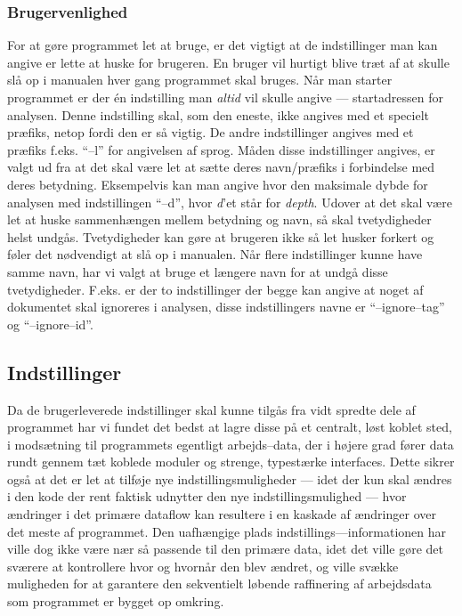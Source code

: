 \documentclass[a4paper,oneside,article]{memoir}
\begin{document}
\subsubsection{Brugervenlighed}
For at gøre programmet let at bruge, er det vigtigt at de
indstillinger man kan angive er lette at huske for brugeren. En bruger
vil hurtigt blive træt af at skulle slå op i manualen hver gang
programmet skal bruges. Når man starter programmet er der én
indstilling man \textit{altid} vil skulle angive --- startadressen for
analysen. Denne indstilling skal, som den eneste, ikke angives med et
specielt præfiks, netop fordi den er så vigtig. De andre indstillinger
angives med et præfiks f.eks. ``--l'' for angivelsen af sprog. Måden
disse indstillinger angives, er valgt ud fra at det skal være let at
sætte deres navn/præfiks i forbindelse med deres
betydning. Eksempelvis kan man angive hvor den maksimale dybde for
analysen med indstillingen ``--d'', hvor \textit{d}'et står for
\textit{depth}. Udover at det skal være let at huske sammenhængen mellem
betydning og navn, så skal tvetydigheder helst undgås. Tvetydigheder
kan gøre at brugeren ikke så let husker forkert og føler det
nødvendigt at slå op i manualen. Når flere indstillinger kunne have
samme navn, har vi valgt at bruge et længere navn for at undgå
disse tvetydigheder. F.eks. er der to indstillinger der begge kan
angive at noget af dokumentet skal ignoreres i analysen, disse
indstillingers navne er ``--ignore--tag'' og ``--ignore--id''.

\subsection{Indstillinger}
Da de brugerleverede indstillinger skal kunne tilgås fra vidt spredte
dele af programmet har vi fundet det bedst at lagre disse på et
centralt, løst koblet sted, i modsætning til programmets egentligt
arbejds--data, der i højere grad fører data rundt gennem tæt koblede
moduler og strenge, typestærke interfaces. Dette sikrer også at det er
let at tilføje nye indstillingsmuligheder --- idet der kun skal ændres
i den kode der rent faktisk udnytter den nye indstillingsmulighed ---
hvor ændringer i det primære dataflow kan resultere i en kaskade af
ændringer over det meste af programmet. Den uafhængige plads
indstillings---informationen har ville dog ikke være nær så passende
til den primære data, idet det ville gøre det sværere at kontrollere
hvor og hvornår den blev ændret, og ville svække muligheden for at
garantere den sekventielt løbende raffinering af arbejdsdata som
programmet er bygget op omkring.
\end{document}
